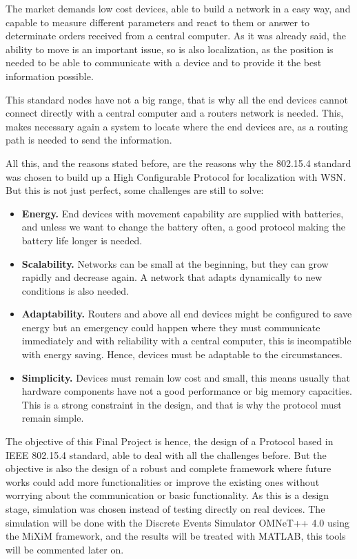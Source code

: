 The market demands low cost devices, able to build a network in a easy way, and capable to measure different parameters and react to them
or answer to determinate orders received from a central computer. As it was already said, the ability to move is an important issue, so is 
also localization, as the position is needed to be able to communicate with a device and to provide it the best information possible.

This standard nodes have not a big range, that is why all the end devices cannot connect directly with a central computer and a routers network 
is needed. This, makes necessary again a system to locate where the end devices are, as a routing path is needed to send the information.

All this, and the reasons stated before, are the reasons why the 802.15.4 standard was chosen to build up a High Configurable Protocol for 
localization with \ac{WSN}. But this is not just perfect, some challenges are still to solve:

\begin{itemize}
 \item \textbf{Energy.} End devices with movement capability are supplied with batteries, and unless we want to change the battery often,
a good protocol making the battery life longer is needed.
 \item \textbf{Scalability.} Networks can be small at the beginning, but they can grow rapidly and decrease again. A network that adapts 
dynamically to new conditions is also needed.
 \item \textbf{Adaptability.} Routers and above all end devices might be configured to save energy but an emergency could happen where they 
must communicate immediately and with reliability with a central computer, this is incompatible with energy saving. Hence, devices must be
adaptable to the circumstances.
 \item \textbf{Simplicity.} Devices must remain low cost and small, this means usually that hardware components have not a good performance
or big memory capacities. This is a strong constraint in the design, and that is why the protocol must remain simple.
\end{itemize}

The objective of this Final Project is hence, the design of a Protocol based in \ac{IEEE} 802.15.4 standard, able to deal with all the 
challenges before. But the objective is also the design of a robust and complete framework where future works could add more functionalities
or improve the existing ones without worrying about the communication or basic functionality.
As this is a design stage, simulation was chosen instead of testing directly on real devices. The simulation will be done with the Discrete 
Events Simulator \ac{OMNeT++} 4.0 using the \ac{MiXiM} framework, and the results will be treated with \ac{MATLAB}, this tools will be commented later on.

